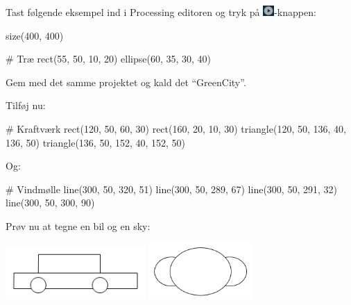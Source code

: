 \documentclass{ucph-handout}
\begin{document}
\begin{exercisebox}[adjusted title=Første program]
Tast følgende eksempel ind i Processing editoren og tryk på
\includegraphics[height=4mm]{../illustrations/images/processing_play_button}-knappen:
\begin{python}
size(400, 400)

# Træ
rect(55, 50, 10, 20)
ellipse(60, 35, 30, 40)
\end{python}

\vspace{3mm}
\noindent
Gem med det samme projektet og kald det ``GreenCity''.

\vspace{3mm}
\noindent
Tilføj nu:
\begin{python}
# Kraftværk
rect(120, 50, 60, 30)
rect(160, 20, 10, 30)
triangle(120, 50, 136, 40, 136, 50)
triangle(136, 50, 152, 40, 152, 50)
\end{python}
\vspace{3mm}
\noindent
Og:
\begin{python}
# Vindmølle
line(300, 50, 320, 51)
line(300, 50, 289, 67)
line(300, 50, 291, 32)
line(300, 50, 300, 90)
\end{python}

Prøv nu at tegne en bil og en sky:

\includegraphics[width=0.4\textwidth]{../illustrations/images/bil-streg.png}
\includegraphics[width=0.3\textwidth]{../illustrations/images/sky.png}
\end{exercisebox}
\end{document}
